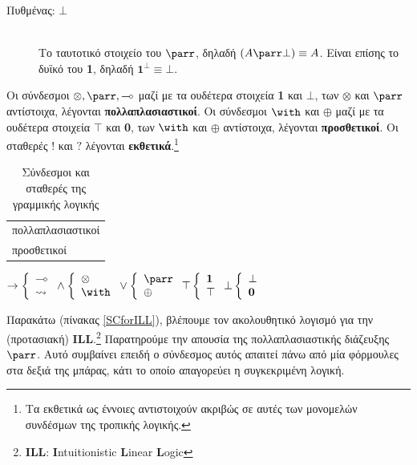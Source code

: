 \documentclass [a4paper,11pt] {book}
\theoremstyle{definition}
\theoremstyle{definition}
\begin{document}
\begin{description}
   \item[Πυθμένας: $\bot$] \hfill \\
   Το ταυτοτικό στοιχείο του $\parr$, δηλαδή $(A\parr\bot)\equiv A$. Είναι επίσης το δυϊκό του \textbf{1}, δηλαδή $\textbf{1}^{\bot}\equiv\bot$.  
\end{description}
Οι σύνδεσμοι $\otimes,\parr,\multimap$ μαζί με τα ουδέτερα στοιχεία \textbf{1} και $\bot$, των $\otimes$ και $\parr$ αντίστοιχα, λέγονται \textbf{πολλαπλασιαστικοί}. Οι σύνδεσμοι $\with$ και $\oplus$ μαζί με τα ουδέτερα στοιχεία $\top$ και \textbf{0}, των $\with$ και $\oplus$ αντίστοιχα, λέγονται \textbf{προσθετικοί}. Οι σταθερές $!$ και $?$ λέγονται \textbf{εκθετικά}.\footnote{Τα εκθετικά ως έννοιες αντιστοιχούν ακριβώς σε αυτές των μονομελών συνδέσμων της τροπικής λογικής.}
\begin{table}[H]
\label{multiplicativesAdditives}
\centering
\begin{tabular}{l}
πολλαπλασιαστικοί
\\
προσθετικοί
\end{tabular}
$\to \left\lbrace {\begin{array}{ll}
\multimap \\ \rightsquigarrow
\end{array}}\right.
\wedge \left \lbrace {\begin{array}{ll}
\otimes \\ \with
\end{array}}\right.
\vee \left \lbrace {\begin{array}{ll}
\parr \\ \oplus
\end{array}}
 \right. 
\top \left\lbrace {\begin{array}{ll}
\textbf{1} \\\top
 \end{array}}\right. 
\bot \left\lbrace {\begin{array}{ll}
\bot \\ \textbf{0} 
 \end{array}}\right. 
 $
\caption{Σύνδεσμοι και σταθερές της γραμμικής λογικής}
\label{tab:connectivesAndConstantsOfLL}
\end{table}


Παρακάτω (πίνακας \ref{SCforILL}), βλέπουμε τον ακολουθητικό λογισμό για την (προτασιακή) \textbf{ILL}.\footnote{\textbf{ILL}: \textbf{I}ntuitionistic \textbf{L}inear \textbf{L}ogic} Παρατηρούμε την απουσία της πολλαπλασιαστικής διάζευξης $\parr$. Αυτό συμβαίνει επειδή ο σύνδεσμος αυτός απαιτεί πάνω από μία φόρμουλες στα δεξιά της μπάρας, κάτι το οποίο απαγορεύει η συγκεκριμένη λογική.
\end{document}
